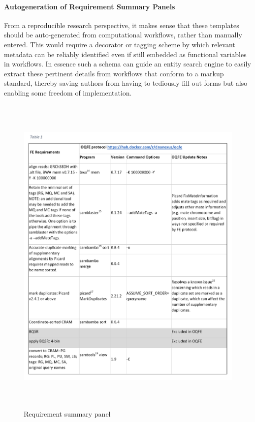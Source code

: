 \documentclass{drexelthesis}
\begin{document}
\paragraph{Autogeneration of Requirement Summary Panels}

From a reproducible research perspective, it makes sense that these templates should be auto-generated from computational workflows, rather than manually entered. This would require a decorator or tagging scheme by which relevant metadata can be reliably identified even if still embedded as functional variables in workflows. In essence such a schema can guide an entity search engine to easily extract these pertinent details from workflows that conform to a markup standard, thereby saving authors from having to tediously fill out forms but also enabling some freedom of implementation.

\begin{figure}[h!]
	\centering
	\includegraphics[width=13.76cm,height=16.25cm]{./images/recpanel.png}
	\caption{Requirement summary panel}
	\label{recpanel}
\end{figure}
\end{document}
